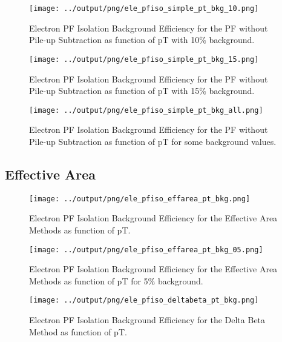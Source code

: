 \documentclass[11pt]{book}
\begin{document}
\begin{figure}[htb]
\centering
\texttt{[image: ../output/png/ele\_pfiso\_simple\_pt\_bkg\_10.png]}
\caption{Electron PF Isolation Background Efficiency for the PF without Pile-up Subtraction as function of pT with 10\% background.}
\label{fig:ele_pfiso_pt_bkg_simple_bkg_10}
\end{figure}

\begin{figure}[htb]
\centering
\texttt{[image: ../output/png/ele\_pfiso\_simple\_pt\_bkg\_15.png]}
\caption{Electron PF Isolation Background Efficiency for the PF without Pile-up Subtraction as function of pT with 15\% background.}
\label{fig:ele_pfiso_pt_bkg_simple_bkg_15}
\end{figure}

\begin{figure}[htb]
\centering
\texttt{[image: ../output/png/ele\_pfiso\_simple\_pt\_bkg\_all.png]}
\caption{Electron PF Isolation Background Efficiency for the PF without Pile-up Subtraction as function of pT for some background values.}
\label{fig:ele_pfiso_pt_bkg_simple_bkg_all}
\end{figure}
\clearpage

\subsection{Effective Area}
\begin{figure}[htb]
\centering
\texttt{[image: ../output/png/ele\_pfiso\_effarea\_pt\_bkg.png]}
\caption{Electron PF Isolation Background Efficiency for the Effective Area Methods as function of pT.}
\label{fig:ele_pfiso_pt_bkg_effarea}
\end{figure}

\begin{figure}[htb]
\centering
\texttt{[image: ../output/png/ele\_pfiso\_effarea\_pt\_bkg\_05.png]}
\caption{Electron PF Isolation Background Efficiency for the Effective Area Methods as function of pT for 5\% background.}
\label{fig:ele_pfiso_pt_bkg_effarea_bkg_05}
\end{figure}


\begin{figure}[htb]
\centering
\texttt{[image: ../output/png/ele\_pfiso\_deltabeta\_pt\_bkg.png]}
\caption{Electron PF Isolation Background Efficiency for the Delta Beta Method as function of pT.}
\label{fig:ele_pfiso_pt_bkg_deltabeta}
\end{figure}
\end{document}
